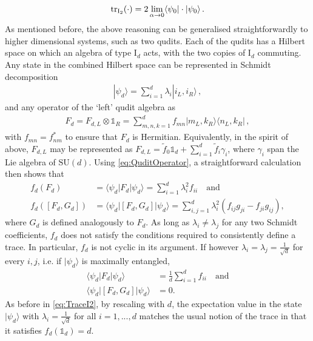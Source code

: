 \documentclass[a4paper,11pt]{article}
\newcommand{\SU}{\text{SU}}
\newcommand{\1}{\mathds{1}}
\begin{document}
\begin{align}
    \tr_{\text{I}_2}(\cdot)=2\lim\limits_{\alpha\to0}\langle\psi_0|\cdot|\psi_0\rangle\,.\label{eq:TraceI2}
\end{align}
As mentioned before, the above reasoning can be generalised straightforwardly to higher dimensional systems, such as two qudits. Each of the qudits has a Hilbert space on which an algebra of type I$_d$ acts, with the two copies of I$_d$ commuting. Any state in the combined Hilbert space can be represented in Schmidt decomposition
\begin{align}
    |\psi_d\rangle=\sum_{i=1}^d\lambda_i|i_L,i_R\rangle\,,
\end{align}
and any operator of the `left' qudit algebra as
\begin{align}
    F_d=F_{d,L}\otimes\1_R=\sum_{m,n,k=1}^df_{mn}|m_L,k_R\rangle\langle n_L,k_R|\,,\label{eq:QuditOperator}
\end{align}
with $f_{mn}=f_{nm}^\ast$ to ensure that $F_d$ is Hermitian. Equivalently, in the spirit of above, $F_{d,L}$ may be represented as $F_{d,L}=\tilde{f}_0\1_d+\sum_{i=1}^d\tilde{f}_i\gamma_i$, where $\gamma_i$ span the Lie algebra of $\SU(d)$. Using \eqref{eq:QuditOperator}, a straightforward calculation then shows that
\begin{align}
    f_d(F_d)&=\langle\psi_d|F_d|\psi_d\rangle=\sum_{i=1}^d\lambda_i^2f_{ii}\quad\text{and}\\
    f_d([F_d,G_d])&=\langle\psi_d|[F_d,G_d]|\psi_d\rangle=\sum_{i,j=1}^d\lambda_i^2(f_{ij}g_{ji}-f_{ji}g_{ij}),
\end{align}
where $G_d$ is defined analogously to $F_d$. As long as $\lambda_i\neq\lambda_j$ for any two Schmidt coefficients, $f_d$ does not satisfy the conditions required to consistently define a trace. In particular, $f_d$ is not cyclic in its argument. If however $\lambda_i=\lambda_j=\frac{1}{\sqrt{d}}$ for every $i,j$, i.e. if $|\psi_d\rangle$ is maximally entangled,
\begin{align}
    \langle\psi_d|F_d|\psi_d\rangle&=\frac{1}{d}\sum_{i=1}^df_{ii}\quad\text{and}\\
    \langle\psi_d|[F_d,G_d]|\psi_d\rangle&=0.
\end{align}
As before in \eqref{eq:TraceI2}, by rescaling with $d$, the expectation value in the state $|\psi_d\rangle$ with $\lambda_i=\frac{1}{\sqrt{d}}$ for all $i=1,...,d$ matches the usual notion of the trace in that it satisfies $f_d(\1_d)=d$.
\end{document}
